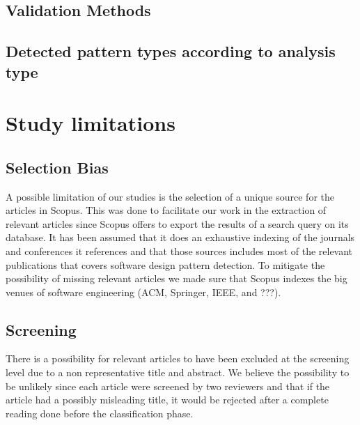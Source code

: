 \documentclass[letterpaper, 10 pt, conference]{ieeeconf}  %
\begin{document}


\subsection{Validation Methods}



\subsection{Detected pattern types according to analysis type}



\section{Study limitations}

\subsection{Selection Bias}

A possible limitation of our studies is the selection of a unique source for 
the articles in Scopus.
This was done to facilitate our work in the extraction of relevant articles
since Scopus offers to export the results of a search query on its database.
It has been assumed that it does an exhaustive indexing of the journals
and conferences it references and that those sources includes most of the
relevant publications that covers software design pattern detection.
To mitigate the possibility of missing relevant articles we made sure that
Scopus indexes the big venues of software engineering (ACM, Springer, IEEE, and
???).

\subsection{Screening}

There is a possibility for relevant articles to have been excluded at the
screening level due to a non representative title and abstract.
We believe the possibility to be unlikely since each article were screened by
two reviewers and that if the article had a possibly misleading title, it would
be rejected after a complete reading done before the classification phase.
\end{document}
